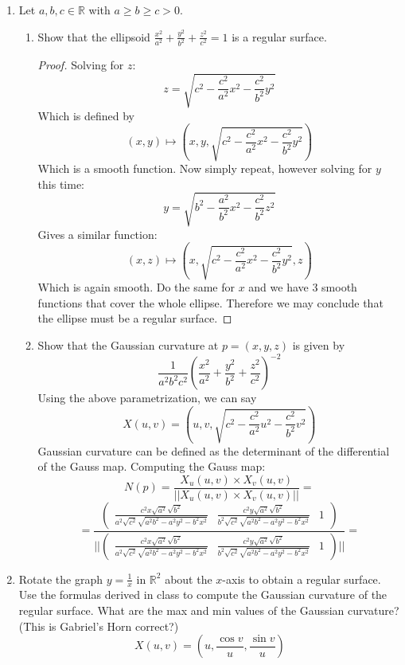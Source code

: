 \documentclass[a4paper,17pt]{extarticle}
\theoremstyle{definition}
\renewcommand{\geq}{\geqslant}
\newcommand{\R}{\mathbb{R}}
\begin{document}
\begin{enumerate}
\begin{enumerate}[label=(\alph*).]
\begin{proof}
    \end{proof}
    \item Use part (d) to show that the restriction of $v\mapsto\langle v,v\rangle_{2,1}$ to $T_{(x,y,z)}S$ is positive-definite.
\end{enumerate}
\item Let $a,b,c\in\R$ with $a\geq b\geq c>0$.\begin{enumerate}[label=(\alph*).]
    \item Show that the ellipsoid $\frac{x^2}{a^2}+\frac{y^2}{b^2}+\frac{z^2}{c^2}=1$ is a regular surface.\begin{proof}Solving for $z$: $$z=\sqrt{c^2-\frac{c^2}{a^2}x^2-\frac{c^2}{b^2}y^2}$$ Which is defined by $$(x,y)\mapsto\left(x,y,\sqrt{c^2-\frac{c^2}{a^2}x^2-\frac{c^2}{b^2}y^2}\right)$$ Which is a smooth function. Now simply repeat, however solving for $y$ this time: $$y=\sqrt{b^2-\frac{a^2}{b^2}x^2-\frac{c^2}{b^2}z^2}$$ Gives a similar function: $$(x,z)\mapsto\left(x,\sqrt{c^2-\frac{c^2}{a^2}x^2-\frac{c^2}{b^2}y^2},z\right)$$ Which is again smooth. Do the same for $x$ and we have 3 smooth functions that cover the whole ellipse. Therefore we may conclude that the ellipse must be a regular surface.
    \end{proof}
    \item Show that the Gaussian curvature at $p=(x,y,z)$ is given by $$\frac{1}{a^2b^2c^2}\left(\frac{x^2}{a^2}+\frac{y^2}{b^2}+\frac{z^2}{c^2}\right)^{-2}$$
    Using the above parametrization, we can say $$X(u,v)=\left(u,v,\sqrt{c^2-\frac{c^2}{a^2}u^2-\frac{c^2}{b^2}v^2}\right)$$
    Gaussian curvature can be defined as the determinant of the differential of the Gauss map. Computing the Gauss map: $$N(p)=\frac{X_u(u,v)\times X_v(u,v)}{||X_u(u,v)\times X_v(u,v)||}=$$ $$=\frac{\begin{pmatrix}\frac{c^2x\sqrt{a^2}\sqrt{b^2}}{a^2\sqrt{c^2}\sqrt{a^2b^2-a^2y^2-b^2x^2}}&\frac{c^2y\sqrt{a^2}\sqrt{b^2}}{b^2\sqrt{c^2}\sqrt{a^2b^2-a^2y^2-b^2x^2}}&1\end{pmatrix}}{||\begin{pmatrix}\frac{c^2x\sqrt{a^2}\sqrt{b^2}}{a^2\sqrt{c^2}\sqrt{a^2b^2-a^2y^2-b^2x^2}}&\frac{c^2y\sqrt{a^2}\sqrt{b^2}}{b^2\sqrt{c^2}\sqrt{a^2b^2-a^2y^2-b^2x^2}}&1\end{pmatrix}||}=$$ 
\end{enumerate}
\item Rotate the graph $y=\frac{1}{x}$ in $\R^2$ about the $x$-axis to obtain a regular surface. Use the formulas derived in class to compute the Gaussian curvature of the regular surface. What are the max and min values of the Gaussian curvature? (This is Gabriel's Horn correct?) $$X(u,v)=(u,\frac{\cos v}{u},\frac{\sin{v}}{u})$$

\end{enumerate}
\end{document}
